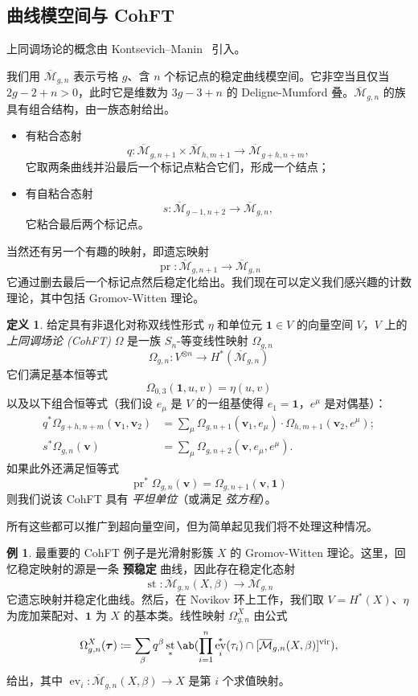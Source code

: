 \documentclass{amsart}
\theoremstyle{definition}
\newtheorem{defn}[thm]{定义}
\newtheorem{exm}[thm]{例}
\theoremstyle{remark}
\theoremstyle{plain}
\theoremstyle{definition}
\theoremstyle{remark}
\newcommand{\Mbar}{\overline{\mathcal{M}}}
\newcommand{\mbf}[1]{\mathbf{#1}}
\newcommand{\bv}{\mbf{v}}
\newcommand{\btau}{\bm{\tau}}
\newcommand{\mr}[1]{\mathrm{#1}}
\newcommand{\1}{\mathbf{1}}
\newcommand{\2}{\mathbf{2}}
\newcommand{\3}{\mathbf{3}}
\newcommand{\vir}{\mr{vir}}
\DeclareMathOperator{\ev}{ev}
\DeclareMathOperator{\st}{st}
\DeclareMathOperator{\pr}{pr}
\begin{document}
\subsection{曲线模空间与 CohFT}%
\label{sub:Moduli of curves and CohFTs}

上同调场论的概念由 Kontsevich--Manin~\cite{KM1994} 引入。

我们用 $\Mbar_{g,n}$ 表示亏格 $g$、含 $n$ 个标记点的稳定曲线模空间。它非空当且仅当 $2g-2+n > 0$，此时它是维数为 $3g-3+n$ 的 Deligne-Mumford 叠。$\Mbar_{g,n}$ 的族具有组合结构，由一族态射给出。
\begin{itemize}
    \item 有粘合态射
        \[q \colon \Mbar_{g,n+1} \times \Mbar_{h, m+1} \to \Mbar_{g+h,n+m}, \]
        它取两条曲线并沿最后一个标记点粘合它们，形成一个结点；
    \item 有自粘合态射 \[s \colon \Mbar_{g-1,n+2} \to \Mbar_{g,n},\]
        它粘合最后两个标记点。
\end{itemize}
当然还有另一个有趣的映射，即遗忘映射
\[ \pr \colon \Mbar_{g,n+1} \to \Mbar_{g,n} \]
它通过删去最后一个标记点然后稳定化给出。我们现在可以定义我们感兴趣的计数理论，其中包括 Gromov-Witten 理论。

\begin{defn}
    给定具有非退化对称双线性形式 $\eta$ 和单位元 $\1 \in V$ 的向量空间 $V$，$V$ 上的 \textit{上同调场论 (CohFT)} $\Omega$ 是一族 $S_n$-等变线性映射 $\Omega_{g,n}$
    \[ \Omega_{g,n} \colon V^{\otimes n} \to H^*(\Mbar_{g,n}) \]
    它们满足基本恒等式
    \[ \Omega_{0,3}(\1, u,v) = \eta(u,v) \]
    以及以下组合恒等式（我们设 $e_{\mu}$ 是 $V$ 的一组基使得 $e_1 = \1$，$e^{\mu}$ 是对偶基）：
    \begin{align*}
        q^* \Omega_{g+h,n+m}(\bv_1, \bv_2) &= \sum_{\mu} \Omega_{g,n+1}(\bv_1, e_{\mu}) \cdot \Omega_{h,m+1}(  \bv_2, e^{\mu} ); \\
        s^* \Omega_{g,n}(\bv) &= \sum_{\mu} \Omega_{g,n+2}(\bv, e_{\mu}, e^{\mu}).
    \end{align*}
    如果此外还满足恒等式
    \[ \pr^*\Omega_{g,n}(\bv) = \Omega_{g,n+1}(\bv,\1) \]
    则我们说该 CohFT 具有 \textit{平坦单位}（或满足 \textit{弦方程}）。
\end{defn}
所有这些都可以推广到超向量空间，但为简单起见我们将不处理这种情况。

\begin{exm}
    最重要的 CohFT 例子是光滑射影簇 $X$ 的 Gromov-Witten 理论。这里，回忆稳定映射的源是一条 \textbf{预稳定} 曲线，因此存在稳定化态射
    \[ \st \colon \Mbar_{g,n}(X,\beta) \to \Mbar_{g,n} \]
    它遗忘映射并稳定化曲线。然后，在 Novikov 环上工作，我们取 $V = H^*(X)$、$\eta$ 为庞加莱配对、$\1$ 为 $X$ 的基本类。线性映射 $\Omega^X_{g,n}$ 由公式
    \[ \Omega_{g,n}^X(\btau) \coloneqq \sum_{\beta} q^{\beta} \st_* \ab(\prod_{i=1}^n \ev_i^*(\tau_i) \cap [\Mbar_{g,n}(X,\beta)]^{\vir}), \]
    给出，其中 $\ev_i \colon \Mbar_{g,n}(X,\beta) \to X$ 是第 $i$ 个求值映射。
\end{exm}
\end{document}
